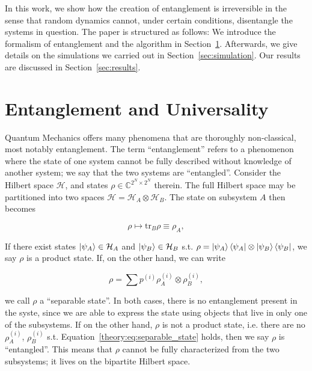 \documentclass[reprint,amsmath,amssymb,aps,prb,nofootinbib]{revtex4-2}
\begin{document}
    In this work, we show how the creation of entanglement is irreversible in the sense that random dynamics cannot,
    under certain conditions, disentangle the systems in question. The paper is structured as follows: We introduce
    the formalism of entanglement and the algorithm in Section~\ref{sec:theory}. Afterwards, we give details on
    the simulations we carried out in Section~\ref{sec:simulation}. Our results are discussed in Section~\ref{sec:results}.

    \section{Entanglement and Universality}
    \label{sec:theory}

    Quantum Mechanics offers many phenomena that are thoroughly non-classical, most notably entanglement. The term
    ``entanglement'' refers to a phenomenon where the state of one system cannot be fully described without knowledge
    of another system; we say that the two systems are ``entangled''. Consider the Hilbert space $\mathcal{H}$,
    and states $\rho\in\mathbb{C}^{2^N\times 2^N}$ therein. The full Hilbert space may be partitioned into two spaces
    $\mathcal{H}=\mathcal{H}_A\otimes\mathcal{H}_B$. The state on subsystem $A$ then becomes

    \begin{equation}
        \rho\mapsto\text{tr}_B\rho\equiv \rho_A,
        \label{theory:eq:reduced_state}
    \end{equation}

    If there exist states $\ket{\psi_A}\in\mathcal{H}_A$ and $\ket{\psi_B}\in\mathcal{H}_B$ s.t.
    $\rho=\ket{\psi_A}\bra{\psi_A}\otimes\ket{\psi_B}\bra{\psi_B}$, we say $\rho$ is a product
    state. If, on the other hand, we can write

    \begin{equation}
        \rho=\sum p^{(i)}\rho_A^{(i)}\otimes\rho_B^{(i)},
        \label{theory:eq:separable_state}
    \end{equation}

    we call $\rho$ a ``separable state''. In both cases, there is no entanglement present in the syste, since we are
    able to express the state using objects that live in only one of the subsystems. If on the other
    hand, $\rho$ is not a product state, i.e. there are no $\rho_A^{(i)}$, $\rho_B^{(i)}$ s.t. Equation~\ref{theory:eq:separable_state}
    holds, then we say $\rho$ is ``entangled''. This means that $\rho$ cannot be fully characterized from the two
    subsystems; it lives on the bipartite Hilbert space.
\end{document}
